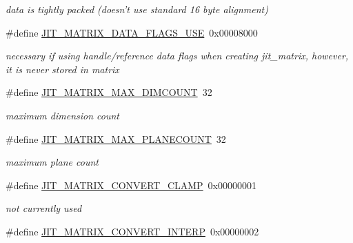 \begin{DoxyCompactItemize}
\begin{DoxyCompactList}\small\item\em data is tightly packed (doesn't use standard 16 byte alignment) \item\end{DoxyCompactList}\item 
\hypertarget{group__jitter_ga54577b5c1a79b9808696965db09fa78d}{
\#define \hyperlink{group__jitter_ga54577b5c1a79b9808696965db09fa78d}{JIT\_\-MATRIX\_\-DATA\_\-FLAGS\_\-USE}~0x00008000}
\label{group__jitter_ga54577b5c1a79b9808696965db09fa78d}

\begin{DoxyCompactList}\small\item\em necessary if using handle/reference data flags when creating jit\_\-matrix, however, it is never stored in matrix \item\end{DoxyCompactList}\item 
\hypertarget{group__jitter_ga3a74bc72df454ac5618a865fd3c56870}{
\#define \hyperlink{group__jitter_ga3a74bc72df454ac5618a865fd3c56870}{JIT\_\-MATRIX\_\-MAX\_\-DIMCOUNT}~32}
\label{group__jitter_ga3a74bc72df454ac5618a865fd3c56870}

\begin{DoxyCompactList}\small\item\em maximum dimension count \item\end{DoxyCompactList}\item 
\hypertarget{group__jitter_gaae5121f82aa81cb79ec17220f845ea08}{
\#define \hyperlink{group__jitter_gaae5121f82aa81cb79ec17220f845ea08}{JIT\_\-MATRIX\_\-MAX\_\-PLANECOUNT}~32}
\label{group__jitter_gaae5121f82aa81cb79ec17220f845ea08}

\begin{DoxyCompactList}\small\item\em maximum plane count \item\end{DoxyCompactList}\item 
\hypertarget{group__jitter_ga10156f72ad806d9e8573f47df19118bd}{
\#define \hyperlink{group__jitter_ga10156f72ad806d9e8573f47df19118bd}{JIT\_\-MATRIX\_\-CONVERT\_\-CLAMP}~0x00000001}
\label{group__jitter_ga10156f72ad806d9e8573f47df19118bd}

\begin{DoxyCompactList}\small\item\em not currently used \item\end{DoxyCompactList}\item 
\hypertarget{group__jitter_gafd3ca93ff4686581454e07c3929934bf}{
\#define \hyperlink{group__jitter_gafd3ca93ff4686581454e07c3929934bf}{JIT\_\-MATRIX\_\-CONVERT\_\-INTERP}~0x00000002}
\label{group__jitter_gafd3ca93ff4686581454e07c3929934bf}


\end{DoxyCompactItemize}
